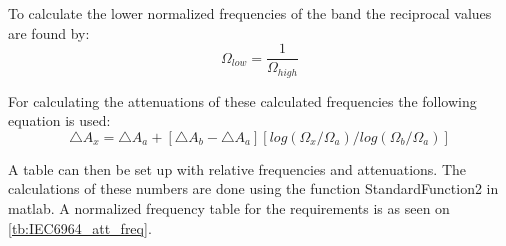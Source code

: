 To calculate the lower normalized frequencies of the band the reciprocal values are found by:
\begin{equation}
\Omega_{low} = \frac{1}{\Omega_{high}}
\end{equation}

For calculating the attenuations of these calculated frequencies the following equation is used:
\begin{equation}
\triangle A_x=\triangle A_a+[\triangle A_b-\triangle A_a][log(\Omega_x/\Omega_a)/log(\Omega_b/\Omega_a)]
\end{equation}
\begin{where}
\end{where}

A table can then be set up with relative frequencies and attenuations. The calculations of these numbers are done using the function StandardFunction2 in matlab. A normalized frequency table for the requirements is as seen on \autoref{tb:IEC6964_att_freq}. 

